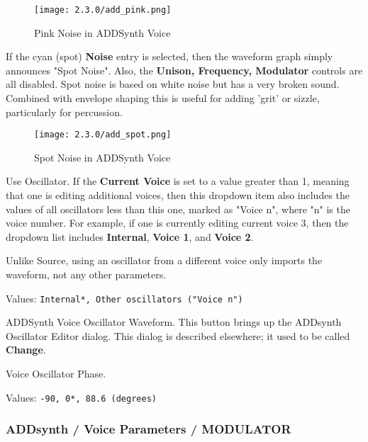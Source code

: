 \begin{figure}[H]
   \centering
   \texttt{[image: 2.3.0/add\_pink.png]}
   \caption{Pink Noise in ADDSynth Voice}
   \label{fig:voice_oscillator_pink_noise}
\end{figure}

   If the cyan (spot) \textbf{Noise} entry is selected,
   then the waveform graph simply announces
   "Spot Noise".  Also, the \textbf{Unison, Frequency, Modulator} controls are
   all disabled.
   Spot noise is based on white noise but has a very broken sound. Combined
   with envelope shaping this is useful for adding 'grit' or sizzle,
   particularly for percussion.

\begin{figure}[H]
   \centering
   \texttt{[image: 2.3.0/add\_spot.png]}
   \caption{Spot Noise in ADDSynth Voice}
   \label{fig:voice_oscillator_spot_noise}
\end{figure}

   Use Oscillator.
   If the \textbf{Current Voice} is set to a value greater than 1, meaning
   that one is editing additional voices, then this dropdown item also
   includes the values of all oscillators less than this one, marked as
   "Voice n", where "n" is the voice number.
   For example, if one is currently editing current voice 3,
   then the dropdown list includes \textbf{Internal}, \textbf{Voice 1}, and
   \textbf{Voice 2}.

  Unlike Source, using an oscillator from a different voice
  only imports the waveform, not any other parameters.

   Values: \texttt{Internal*, Other oscillators ("Voice n")}

   ADDSynth Voice Oscillator Waveform.
   This button brings up the ADDsynth Oscillator Editor dialog.
   This dialog is described elsewhere; it used to be called
   \textbf{Change}.

   Voice Oscillator Phase.

   Values: \texttt{-90, 0*, 88.6 (degrees)}

\subsubsection{ADDsynth / Voice Parameters / MODULATOR}
\label{subsubsec:addsynth_voice_parameters_modulator}

